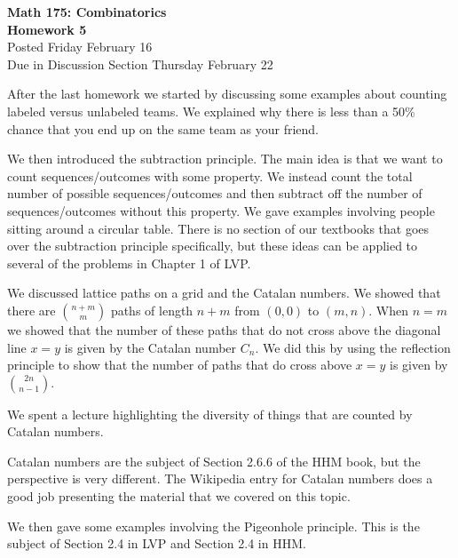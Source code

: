 \documentclass[11pt]{article}
\begin{document}
\begin{center}
{\Large \bf Math 175: Combinatorics} \\
{\Large \bf Homework 5}\\
{\Large Posted Friday February 16\\
Due in Discussion Section Thursday February 22}
\end{center}

\vspace{5mm}

After the last homework we started by discussing some examples about counting labeled versus unlabeled teams.  We explained why there is less than a 50\% chance that you end up on the same team as your friend.

We then introduced the subtraction principle.  The main idea is that we want to count sequences/outcomes with some property.  We instead count the total number of possible sequences/outcomes and then subtract off the number of sequences/outcomes without this property.  We gave examples involving people sitting around a circular table.  There is no section of our textbooks that goes over the subtraction principle specifically, but these ideas can be applied to several of the problems in Chapter 1 of LVP.

We discussed lattice paths on a grid and the Catalan numbers.  We showed that there are $\binom{n+m}{m}$ paths of length $n+m$ from $(0,0)$ to $(m,n)$.  When $n=m$ we showed that the number of these paths that do not cross above the diagonal line $x=y$ is given by the Catalan number $C_n$.  We did this by using the reflection principle to show that the number of paths that do cross above $x=y$ is given by $\binom{2n}{n-1}$.  

We spent a lecture highlighting the diversity of things that are counted by Catalan numbers. 

Catalan numbers are the subject of Section 2.6.6 of the HHM book, but the perspective is very different.  The Wikipedia entry for Catalan numbers does a good job presenting the material that we covered on this topic.  

We then gave some examples involving the Pigeonhole principle.  This is the subject of Section 2.4 in LVP and Section 2.4 in HHM.  


\end{document}
